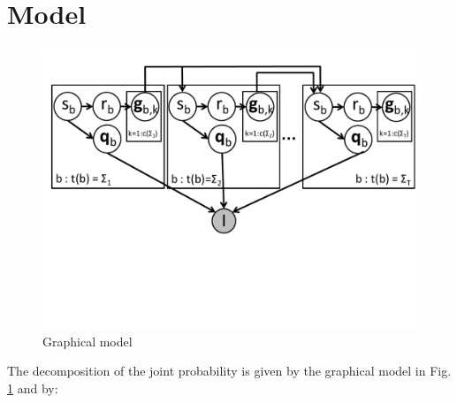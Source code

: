 \documentclass[11pt]{article}
\begin{document}
\section{Model}

\begin{figure}[htbp]
\begin{center}
\includegraphics[width=\textwidth, trim=0cm 6cm 0cm 0cm]{gm.pdf}
\caption{Graphical model}
\label{gm}
\end{center}
\end{figure}

\FloatBarrier

The decomposition of the joint probability is given by the graphical model in Fig. \ref{gm} and by: \\
\end{document}

